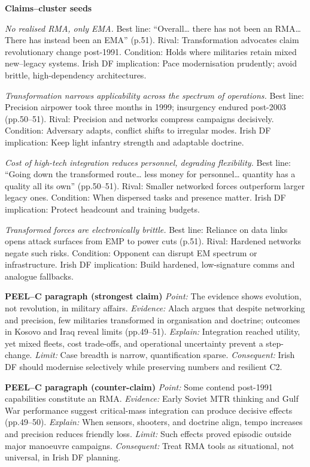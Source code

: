 \textbf{Claims–cluster seeds}

\textit{No realised RMA, only EMA.} Best line: “Overall… there has not been an RMA… There has instead been an EMA” (p.51). Rival: Transformation advocates claim revolutionary change post-1991. Condition: Holds where militaries retain mixed new–legacy systems. Irish DF implication: Pace modernisation prudently; avoid brittle, high-dependency architectures.

\textit{Transformation narrows applicability across the spectrum of operations.} Best line: Precision airpower took three months in 1999; insurgency endured post-2003 (pp.50–51). Rival: Precision and networks compress campaigns decisively. Condition: Adversary adapts, conflict shifts to irregular modes. Irish DF implication: Keep light infantry strength and adaptable doctrine.

\textit{Cost of high-tech integration reduces personnel, degrading flexibility.} Best line: “Going down the transformed route… less money for personnel… quantity has a quality all its own” (pp.50–51). Rival: Smaller networked forces outperform larger legacy ones. Condition: When dispersed tasks and presence matter. Irish DF implication: Protect headcount and training budgets.

\textit{Transformed forces are electronically brittle.} Best line: Reliance on data links opens attack surfaces from EMP to power cuts (p.51). Rival: Hardened networks negate such risks. Condition: Opponent can disrupt EM spectrum or infrastructure. Irish DF implication: Build hardened, low-signature comms and analogue fallbacks.

\textbf{PEEL–C paragraph (strongest claim)}
\textit{Point:} The evidence shows evolution, not revolution, in military affairs.
\textit{Evidence:} Alach argues that despite networking and precision, few militaries transformed in organisation and doctrine; outcomes in Kosovo and Iraq reveal limits (pp.49–51).
\textit{Explain:} Integration reached utility, yet mixed fleets, cost trade-offs, and operational uncertainty prevent a step-change.
\textit{Limit:} Case breadth is narrow, quantification sparse.
\textit{Consequent:} Irish DF should modernise selectively while preserving numbers and resilient C2.

\textbf{PEEL–C paragraph (counter-claim)}
\textit{Point:} Some contend post-1991 capabilities constitute an RMA.
\textit{Evidence:} Early Soviet MTR thinking and Gulf War performance suggest critical-mass integration can produce decisive effects (pp.49–50).
\textit{Explain:} When sensors, shooters, and doctrine align, tempo increases and precision reduces friendly loss.
\textit{Limit:} Such effects proved episodic outside major manoeuvre campaigns.
\textit{Consequent:} Treat RMA tools as situational, not universal, in Irish DF planning.


